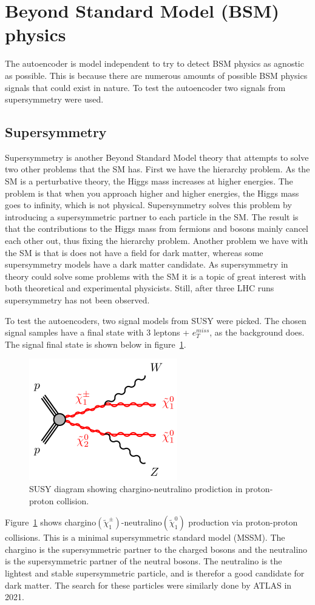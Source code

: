 \section{Beyond Standard Model (BSM) physics}
The autoencoder is model independent to try to detect BSM physics as agnostic as possible. This is because there are 
numerous amounts of possible BSM physics signals that could exist in nature. To test the autoencoder two 
signals from supersymmetry were used.
\subsection*{Supersymmetry}
Supersymmetry is another Beyond Standard Model theory that attempts to solve two other problems that the SM has. 
First we have the hierarchy problem. As the SM is a perturbative theory, the Higgs mass increases at 
higher energies. The problem is that when you approach higher and higher energies, the Higgs mass goes to infinity, 
which is not physical. Supersymmetry solves this problem by introducing a supersymmetric partner to each particle
in the SM. The result is that the contributions to the Higgs mass from fermions and bosons mainly cancel each other out, 
thus fixing the hierarchy problem. Another problem we have with the SM
is that is does not have a field for dark matter, whereas some supersymmetry models have a dark matter candidate.
As supersymmetry in theory could solve some problems with the SM it is a topic of great interest with both theoretical and 
experimental physicists. Still, after three LHC runs supersymmetry has not been observed\cite{atlas_search_2021}. \par 

To test the autoencoders, two signal models from SUSY were picked. The chosen signal samples have a final state with 3 leptons + $e_T^{miss}$,
as the background does. The signal final state is shown below in figure \ref{fig:sysy_feyn}. 

\begin{figure}[H]
    \centering
    \includegraphics[width=0.4\linewidth]{Figures/susy/C1N2-WZN1N1.png}
    \caption[SUSY feynman diagram]{SUSY diagram showing chargino-neutralino prodiction in proton-proton collision. }
    \label{fig:sysy_feyn}
\end{figure}

Figure \ref{fig:sysy_feyn} shows chargino$(\tilde{\chi}_1^{\pm})$-neutralino$(\tilde{\chi}_1^{0})$ production via proton-proton collisions. 
This is a minimal supersymmetric standard model (MSSM). The chargino is the supersymmetric partner 
to the charged bosons and the neutralino is the supersymmetric partner of the neutral bosons. The neutralino
is the lightest and stable supersymmetric particle, and is therefor a good candidate for dark matter. 
The search for these particles were similarly done by ATLAS in 2021\cite{atlas_search_2021}. 